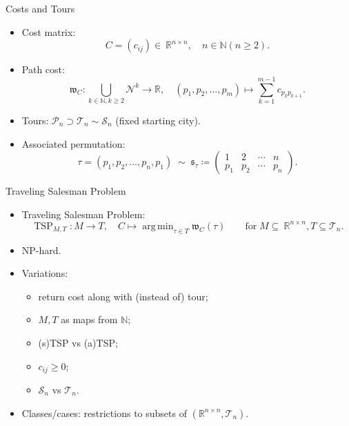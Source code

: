 \documentclass[
  size=10pt,
  style=klope,
  paper=screen,
  pauseslide,
  nopagebreaks,
  fleqn
]{powerdot}
\DeclareMathOperator*{\argmin}{arg\,min}
\begin{document}
\begin{slide}{Costs and Tours}
\begin{itemize}
  \item
  Cost matrix:
  \begin{equation}
    C = \left(c_{ij}\right) \in~\mathbb{R}^{n \times n},
    \quad n \in \mathbb{N} \left(n \geq 2\right).
  \end{equation}
  \item
  Path cost:
  \begin{equation}
    \mathfrak{w}_C: \bigcup_{k \in \mathbb{N}, k \geq 2}\mathcal{N}^k \to \mathbb{R}, \quad
    \left(p_1,p_2,\ldots,p_m\right) \mapsto \sum_{k=1}^{m-1} c_{p_k p_{k+1}}.
  \end{equation}
  \item
  Tours: $\mathcal{P}_n \supset \mathcal{T}_n \sim \mathcal{S}_n$ (fixed starting city).
  \item
  Associated permutation:
  \begin{equation}
  \tau = \left(p_1, p_2, \ldots, p_n, p_1 \right)
  \; \sim \;
  \mathfrak{s}_\tau \coloneqq
  \begin{pmatrix}
    1 & 2 & \cdots & n \\
    p_1 & p_2 & \cdots &  p_n
  \end{pmatrix}.
  \end{equation}
\end{itemize}
\end{slide}

\begin{slide}{Traveling Salesman Problem}
\begin{itemize}
  \item
  Traveling Salesman Problem:
  \begin{equation}
    \operatorname{TSP}_{M,T}: M \to T, \quad
    C \mapsto \argmin_{\tau \in T} \mathfrak{w}_C\left(\tau\right)
    \qquad \text{for} \; M \subseteq~\mathbb{R}^{n \times n}, T \subseteq \mathcal{T}_n.
  \end{equation}
  \item
  NP-hard.
  \item
  Variations:
  \begin{itemize}
  \item return cost along with (instead of) tour;
  \item $M, T$ as maps from $\mathbb{N}$;
  \item (s)TSP vs (a)TSP;
  \item $c_{ij} \geq 0$;
  \item $\mathcal{S}_n$ vs $\mathcal{T}_n$.
  \end{itemize}
  \item
  Classes/cases: restrictions to subsets of $(\mathbb{R}^{n \times n}, \mathcal{T}_n)$.
\end{itemize}
\end{slide}
\end{document}
